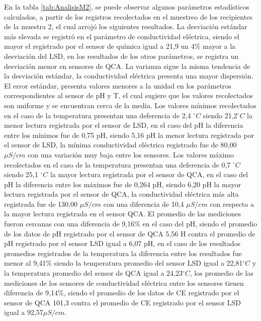 En la tabla \ref{tab:AnalisisM2}, se puede observar algunos par\'ametros estad\'isticos calculados, a partir de los registros recolectados en el muestreo de los recipientes de la muestra 2, el cual arroj\'o los siguientes resultados. 
La desviaci\'on est\'andar m\'as elevada se registr\'o en el par\'ametro de conductividad el\'ectrica, siendo el mayor el registrado por el sensor de qu\'imica igual a 21,9 un  4\%  mayor a la desviación del LSD, en los resultados de  los otros par\'ametros, se registra un desviaci\'on menor en sensores de QCA. 
La varianza sigue la misma tendencia de la desviaci\'on est\'andar, la conductividad el\'ectrica presenta una mayor dispersi\'on. 
El error est\'andar, presenta valores menores a la unidad  en los par\'ametros correspondientes al sensor de pH y T, el cual sugiere que los valores recolectados son uniforme y se encuentran cerca de la media. 
Los valores mínimos recolectados en el caso de la temperatura presentan una deferencia de 2,4 $ ^{\circ}C$ siendo 21,2$ ^{\circ}C$ la menor lectura registrada por el sensor de LSD, en el caso del pH la diferencia entre los mínimos fue de 0,75 pH, siendo 5,16 pH la menor lectura registrada por el sensor de LSD, la m\'inima conductividad el\'ectrica registrado fue de 80,00 $\mu S/cm$ con una variaci\'on muy baja entre los sensores. 
Los valores m\'aximo recolectados en el caso de la temperatura presentan una deferencia de 0,7 $ ^{\circ}C$ siendo 25,1 $ ^{\circ}C$ la mayor lectura registrada por el sensor de QCA, en el caso del pH la diferencia entre los m\'aximos fue de 0,264 pH, siendo 6,20 pH la mayor lectura registrada por el sensor de QCA, la conductividad el\'ectrica m\'as alta registrada fue de 130,00 $\mu S/cm$ con una diferencia de 10,4 $\mu S/cm$ con respecto a la mayor lectura registrada en el sensor QCA.
El promedio de las mediciones fueron cercanas con una diferencia de 9,16$\%$ en el caso del pH, siendo el promedio de los datos de pH registrado por el sensor de QCA 5,56 H contra el promedio de pH registrado por el sensor LSD igual a 6,07 pH, en el caso de los resultados promedios registrados de la temperatura la diferencia entre los resultados fue menor al 9,41$\%$ siendo la temperatura promedio del sensor LSD igual a 22,81$ ^{\circ}C$ y la temperatura promedio del sensor de QCA igual a 24,23$^{\circ}C$, los promedio de las mediciones de los sensores de conductividad eléctrica entre los sensores tienen diferencia de 9,14$\%$, siendo el promedio de los datos de CE registrado por el sensor de QCA 101,3 contra el promedio de CE registrado por el sensor LSD igual a 92,57$\mu S/cm$.
